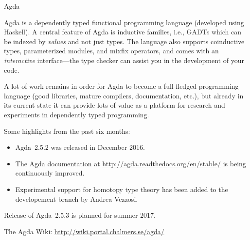 \begin{hcarentry}[updated]{Agda}
\label{agda}
\makeheader

Agda is a dependently typed functional programming language (developed
using Haskell). A central feature of Agda is inductive families,
i.e., GADTs which can be indexed by \emph{values} and not just types.
The language also supports coinductive types, parameterized modules,
and mixfix operators, and comes with an \emph{interactive}
interface---the type checker can assist you in the development of your
code.

A lot of work remains in order for Agda to become a full-fledged
programming language (good libraries, mature compilers, documentation,
etc.), but already in its current state it can provide lots of value as a
platform for research and experiments in dependently typed programming.

Some highlights from the past six months:
\begin{itemize}
\item Agda~2.5.2 was released in December 2016.
\item The Agda documentation at
\url{http://agda.readthedocs.org/en/stable/} is being continuously improved.
\item Experimental support for homotopy type theory has been added to the
developement branch by Andrea Vezzosi.
\end{itemize}
Release of Agda~2.5.3 is planned for summer 2017.

\FurtherReading
  The Agda Wiki: \url{http://wiki.portal.chalmers.se/agda/}
\end{hcarentry}
